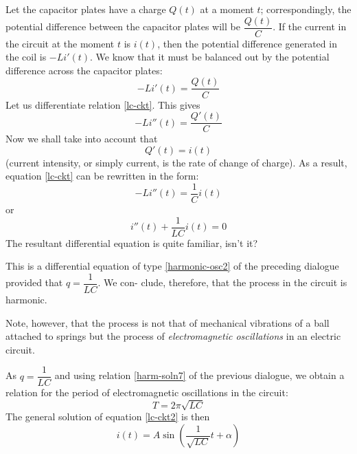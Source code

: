 Let the capacitor plates have a charge $Q(t)$ at a moment $t$; correspondingly, the potential difference between the capacitor plates will be $\dfrac{Q(t)}{C}$. If the current in the circuit at the moment $t$ is $i (t)$, then the potential difference generated in the coil is $-L i' (t)$. We know that it must be balanced out by the potential difference across the capacitor plates:
\begin{equation}%
- L i' (t) = \dfrac{Q(t)}{C}	
\label{lc-ckt}
\end{equation}
Let us differentiate relation \eqref{lc-ckt}. This gives
\begin{equation}%
-Li''(t)=  \dfrac{Q'(t)}{C}	
\label{lc-ckt}
\end{equation}
Now we shall take into account that
\begin{equation*}%
Q'(t) = i(t)
\end{equation*}
(current intensity, or simply current, is the rate of change of charge). As a result, equation \eqref{lc-ckt} can be rewritten in the form:
\begin{equation*}%
-L i'' (t) = \dfrac{1}{C} i (t)
\end{equation*}
or
\begin{equation}%
\boxed{
i'' (t) + \dfrac{1}{LC} i (t) = 0
 }
\label{lc-ckt2}
\end{equation}
The resultant differential equation is quite familiar, isn't it?

\rdr This is a differential equation of type \eqref{harmonic-osc2}
of the preceding dialogue provided that $q = \dfrac{1}{LC}$. We con-
clude, therefore, that the process in the circuit is harmonic. 

\athr Note, however, that the process is not that of mechanical vibrations of a ball attached to springs but the process of \emph{electromagnetic oscillations} in an electric circuit. 

\rdr As  $q = \dfrac{1}{LC}$ and using relation \eqref{harm-soln7} of the previous dialogue, we obtain a relation for the period of electromagnetic oscillations in the circuit:
\begin{equation}%
T =  2 \pi \sqrt{LC}
\label{lc-ckt-period}
\end{equation}
The general solution of equation \eqref{lc-ckt2} is then
\begin{equation}%
i (t) = A \sin \left( \frac{1}{\sqrt{LC}} t + \alpha \right) 
\label{lc-ckt-soln}
\end{equation}

